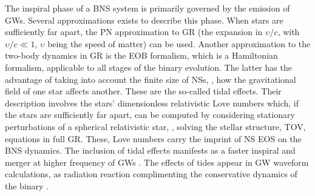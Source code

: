 The inspiral phase of a \ac{BNS} system is primarily governed by the emission 
of \acp{GW}. Several approximations exists to describe this phase.
When stars are sufficiently far apart, the \ac{PN} approximation to \ac{GR} 
(the expansion in $\upsilon/c$, with $\upsilon/c\ll 1$, $\upsilon$ 
being the speed of matter) can be used. 
Another approximation to the two-body dynamics in \ac{GR} is the \ac{EOB} formalism,
which is a Hamiltonian formalism, applicable to all stages of the binary evolution.
%
The latter has the advantage of taking into account the finite size of \acp{NS}, \ie, 
how the gravitational field of one star affects another. 
These are the so-called tidal effects. 
Their description involves the stars' dimensionless relativistic Love numbers \citep{Damour:2009vw,Binnington:2009bb} which,  
if the stars are sufficiently far apart, 
can be computed by considering stationary perturbations 
of a spherical relativistic star, \ie, solving the stellar structure, 
\ac{TOV}, equations in full \ac{GR}.
These, Love numbers carry the imprint of \ac{NS} \ac{EOS} on the \ac{BNS} dynamics.
%
The inclusion of tidal effects manifests as a faster inspiral and merger at higher 
frequency of \acp{GW} \citep{Damour:2009wj}.
%
The effects of tides appear in \ac{GW} waveform calculations, as radiation reaction 
complimenting the conservative dynamics of the binary \citep{Damour:2008gu}. 


